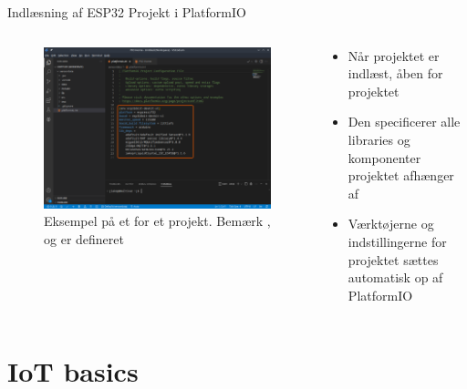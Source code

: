 \documentclass[aspectratio=169]{beamer}
\begin{document}
\begin{frame}{Indlæsning af ESP32 Projekt i PlatformIO}
\begin{columns}
	\begin{column}{0.5\textwidth}
		\begin{figure}
  			\includegraphics[width=\textwidth,keepaspectratio=true]{assets/pictures/pio-projects-6.png}
  			\caption{Eksempel på et  for et projekt. Bemærk ,  og  er defineret}
  			\label{fig:pio-project6}
		\end{figure}
	\end{column}
	\begin{column}{0.5\textwidth}
		\begin{textBox}
			\begin{itemize}
				\item Når projektet er indlæst, åben  for projektet
				\item Den specificerer alle libraries og komponenter projektet afhænger af
				\item Værktøjerne og indstillingerne for projektet sættes automatisk op af PlatformIO
			\end{itemize}
		\end{textBox}
	\end{column}
\end{columns}
\end{frame}

\section{IoT basics}
\begin{frame}
\end{frame}
\end{document}
